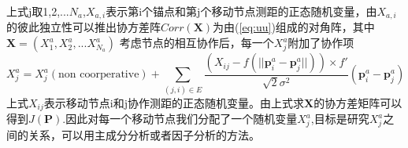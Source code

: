 \documentclass[12pt]{article}
\begin{document}
上式j取1,2,...$N_a$,$X_{a,i}$表示第i个锚点和第j个移动节点测距的正态随机变量，由$X_{a,i}$的彼此独立性可以推出协方差阵$Corr(\bm{X})$为由(\ref{eq:uu})组成的对角阵，其中$\bm{X}=(X^a_1,X^a_2,...X^a_{N_a})$
考虑节点的相互协作后，每一个$X^a_j$附加了协作项
\begin{equation}
X^a_j=X^a_j(\text{non coorperative})+\sum_{(j,i)\in E}\frac{(X_{ij}-f(||\bm{p}^a_i-\bm{p}^a_j||))\times f'}{\sqrt{2}\sigma^2}(\bm{p}^a_i-\bm{p}^a_j)
\end{equation}
上式$X_{ij}$表示移动节点i和j协作测距的正态随机变量。由上式求$\bm{X}$的协方差矩阵可以得到$J(\bm{P})$.因此对每一个移动节点我们分配了一个随机变量$X^a_j$,目标是研究$X^a_j$之间的关系，可以用主成分分析或者因子分析的方法。
\end{document}
